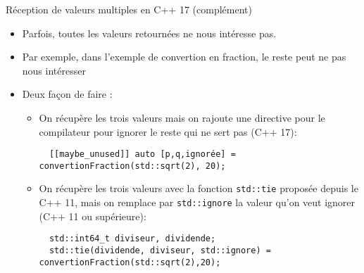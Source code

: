 \documentclass[compress,10pt,aspectratio=169]{beamer}
\begin{document}
  \begin{frame}[fragile]{Réception de valeurs multiples en C++ 17 (complément)}
  \scriptsize
  
  \begin{itemize}
  \item Parfois, toutes les valeurs retournées ne nous intéresse pas.
  \item Par exemple, dans l'exemple de convertion en fraction, le reste peut ne pas nous intéresser
  \item Deux façon de faire :
  \begin{itemize}
  \scriptsize 
  \item On récupère les trois valeurs mais on rajoute une directive pour le compilateur pour ignorer le reste qui ne sert pas (C++ 17):
  \begin{verbatim}
  [[maybe_unused]] auto [p,q,ignorée] =   convertionFraction(std::sqrt(2), 20);
  \end{verbatim}
  \item On récupère les trois valeurs avec la fonction \texttt{std::tie} proposée depuis le C++ 11, mais on remplace par \texttt{std::ignore}
  la valeur qu'on veut ignorer (C++ 11 ou supérieure):
  \begin{verbatim}
  std::int64_t diviseur, dividende;
  std::tie(dividende, diviseur, std::ignore) = convertionFraction(std::sqrt(2),20);
  \end{verbatim}
  \end{itemize}
  \end{itemize}
\end{frame}
\end{document}
